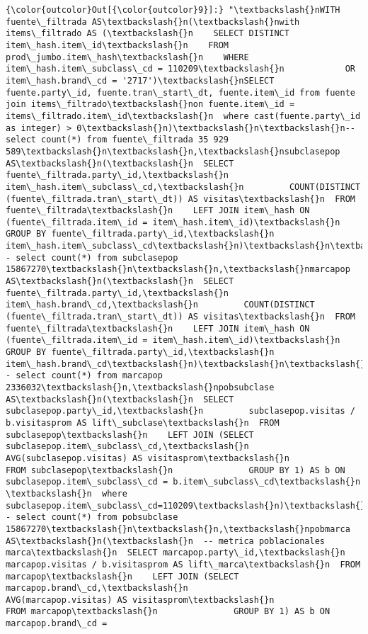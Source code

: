 \documentclass[11pt]{article}
\begin{document}
\begin{Verbatim}[commandchars=\\\{\}]
{\color{outcolor}Out[{\color{outcolor}9}]:} "\textbackslash{}nWITH fuente\_filtrada AS\textbackslash{}n(\textbackslash{}nwith items\_filtrado AS (\textbackslash{}n    SELECT DISTINCT item\_hash.item\_id\textbackslash{}n    FROM prod\_jumbo.item\_hash\textbackslash{}n    WHERE item\_hash.item\_subclass\_cd = 110209\textbackslash{}n            OR item\_hash.brand\_cd = '2717')\textbackslash{}nSELECT fuente.party\_id, fuente.tran\_start\_dt, fuente.item\_id from fuente join items\_filtrado\textbackslash{}non fuente.item\_id = items\_filtrado.item\_id\textbackslash{}n  where cast(fuente.party\_id as integer) > 0\textbackslash{}n)\textbackslash{}n\textbackslash{}n-- select count(*) from fuente\_filtrada 35 929 589\textbackslash{}n\textbackslash{}n,\textbackslash{}nsubclasepop AS\textbackslash{}n(\textbackslash{}n  SELECT fuente\_filtrada.party\_id,\textbackslash{}n         item\_hash.item\_subclass\_cd,\textbackslash{}n         COUNT(DISTINCT (fuente\_filtrada.tran\_start\_dt)) AS visitas\textbackslash{}n  FROM fuente\_filtrada\textbackslash{}n    LEFT JOIN item\_hash ON (fuente\_filtrada.item\_id = item\_hash.item\_id)\textbackslash{}n  GROUP BY fuente\_filtrada.party\_id,\textbackslash{}n           item\_hash.item\_subclass\_cd\textbackslash{}n)\textbackslash{}n\textbackslash{}n-- select count(*) from subclasepop 15867270\textbackslash{}n\textbackslash{}n,\textbackslash{}nmarcapop AS\textbackslash{}n(\textbackslash{}n  SELECT fuente\_filtrada.party\_id,\textbackslash{}n         item\_hash.brand\_cd,\textbackslash{}n         COUNT(DISTINCT (fuente\_filtrada.tran\_start\_dt)) AS visitas\textbackslash{}n  FROM fuente\_filtrada\textbackslash{}n    LEFT JOIN item\_hash ON (fuente\_filtrada.item\_id = item\_hash.item\_id)\textbackslash{}n  GROUP BY fuente\_filtrada.party\_id,\textbackslash{}n           item\_hash.brand\_cd\textbackslash{}n)\textbackslash{}n\textbackslash{}n-- select count(*) from marcapop 2336032\textbackslash{}n,\textbackslash{}npobsubclase AS\textbackslash{}n(\textbackslash{}n  SELECT subclasepop.party\_id,\textbackslash{}n         subclasepop.visitas / b.visitasprom AS lift\_subclase\textbackslash{}n  FROM subclasepop\textbackslash{}n    LEFT JOIN (SELECT subclasepop.item\_subclass\_cd,\textbackslash{}n                      AVG(subclasepop.visitas) AS visitasprom\textbackslash{}n               FROM subclasepop\textbackslash{}n               GROUP BY 1) AS b ON subclasepop.item\_subclass\_cd = b.item\_subclass\_cd\textbackslash{}n  \textbackslash{}n  where subclasepop.item\_subclass\_cd=110209\textbackslash{}n)\textbackslash{}n-- select count(*) from pobsubclase 15867270\textbackslash{}n\textbackslash{}n,\textbackslash{}npobmarca AS\textbackslash{}n(\textbackslash{}n  -- metrica poblacionales marca\textbackslash{}n  SELECT marcapop.party\_id,\textbackslash{}n         marcapop.visitas / b.visitasprom AS lift\_marca\textbackslash{}n  FROM marcapop\textbackslash{}n    LEFT JOIN (SELECT marcapop.brand\_cd,\textbackslash{}n                      AVG(marcapop.visitas) AS visitasprom\textbackslash{}n               FROM marcapop\textbackslash{}n               GROUP BY 1) AS b ON marcapop.brand\_cd = 
\end{Verbatim}
\end{document}
